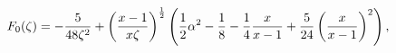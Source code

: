 \[F_{0}(\zeta)=-\frac{5}{48\zeta^{2}}+\left(\frac{x-1}{x\zeta}\right)^{\frac{1}{%
2}}\left(\frac{1}{2}\alpha^{2}-\frac{1}{8}-\frac{1}{4}\frac{x}{x-1}+\frac{5}{2%
4}\left(\frac{x}{x-1}\right)^{2}\right),\]